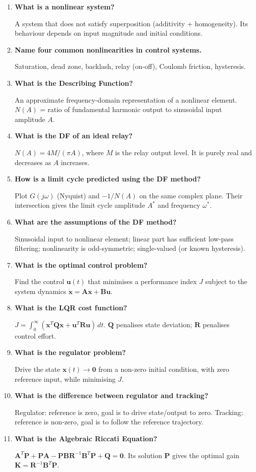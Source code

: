 \documentclass[12pt,a4paper]{article}
\newcommand{\Q}[1]{\textbf{#1}\par\noindent\ignorespaces}
\begin{document}
\begin{tcolorbox}[exambox, title={\textbf{Frequently Asked / Viva Questions}}]
\begin{enumerate}[topsep=0pt, label=\textbf{Q\arabic*.}, itemsep=5pt]
  \item \Q{What is a nonlinear system?}
    A system that does not satisfy superposition (additivity + homogeneity). Its behaviour depends on input magnitude and initial conditions.
  \item \Q{Name four common nonlinearities in control systems.}
    Saturation, dead zone, backlash, relay (on-off), Coulomb friction, hysteresis.
  \item \Q{What is the Describing Function?}
    An approximate frequency-domain representation of a nonlinear element. $N(A)$ = ratio of fundamental harmonic output to sinusoidal input amplitude $A$.
  \item \Q{What is the DF of an ideal relay?}
    $N(A) = 4M/(\pi A)$, where $M$ is the relay output level. It is purely real and decreases as $A$ increases.
  \item \Q{How is a limit cycle predicted using the DF method?}
    Plot $G(j\omega)$ (Nyquist) and $-1/N(A)$ on the same complex plane. Their intersection gives the limit cycle amplitude $A^*$ and frequency $\omega^*$.
  \item \Q{What are the assumptions of the DF method?}
    Sinusoidal input to nonlinear element; linear part has sufficient low-pass filtering; nonlinearity is odd-symmetric; single-valued (or known hysteresis).
  \item \Q{What is the optimal control problem?}
    Find the control $\mathbf{u}(t)$ that minimises a performance index $J$ subject to the system dynamics $\dot{\mathbf{x}}=\mathbf{A}\mathbf{x}+\mathbf{B}\mathbf{u}$.
  \item \Q{What is the LQR cost function?}
    $J = \int_0^\infty (\mathbf{x}^T\mathbf{Q}\mathbf{x} + \mathbf{u}^T\mathbf{R}\mathbf{u})\,dt$. $\mathbf{Q}$ penalises state deviation; $\mathbf{R}$ penalises control effort.
  \item \Q{What is the regulator problem?}
    Drive the state $\mathbf{x}(t)\to\mathbf{0}$ from a non-zero initial condition, with zero reference input, while minimising $J$.
  \item \Q{What is the difference between regulator and tracking?}
    Regulator: reference is zero, goal is to drive state/output to zero. Tracking: reference is non-zero, goal is to follow the reference trajectory.
  \item \Q{What is the Algebraic Riccati Equation?}
    $\mathbf{A}^T\mathbf{P}+\mathbf{P}\mathbf{A}-\mathbf{P}\mathbf{B}\mathbf{R}^{-1}\mathbf{B}^T\mathbf{P}+\mathbf{Q}=\mathbf{0}$. Its solution $\mathbf{P}$ gives the optimal gain $\mathbf{K}=\mathbf{R}^{-1}\mathbf{B}^T\mathbf{P}$.
\end{enumerate}
\end{tcolorbox}
\end{document}
